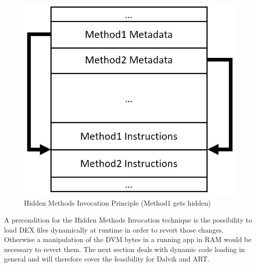 \begin{figure}[htb]
  \centering
  \includegraphics[scale=0.4]{figures/hidden_method_invocation}
  \caption[Hidden Methods Invocation]{Hidden Methods Invocation Principle (Method1 gets hidden)}
  \label{fig:hidden_method_invocation}
\end{figure}

A precondition for the Hidden Methods Invocation technique is the
possibility to load DEX files dynamically at runtime in order to revert
those changes. Otherwise a manipulation of the DVM bytes in a running app in RAM would be necessary to revert them. The next section deals with dynamic
code loading in general and will therefore cover the feasibility for Dalvik
and ART.

